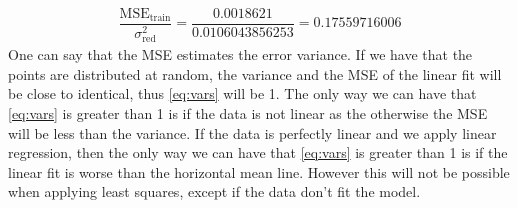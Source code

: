 \documentclass{article}
\begin{document}
\begin{align}
\label{eq:vars}
\dfrac{\text{MSE}_{\text{train}}}{\sigma^2_{\text{red}}} =
\dfrac{0.0018621}{0.0106043856253} = 0.17559716006
\end{align}
One can say that the MSE estimates the error variance. If we have that the points are distributed at random, the variance and the MSE of the linear fit will be close to identical, thus \eqref{eq:vars} will be 1. The only way we can have that \eqref{eq:vars} is greater than 1 is if the data is not linear as the otherwise the MSE will be less than the variance. If the data is perfectly linear and we apply linear regression, then the only way we can have that \eqref{eq:vars} is greater than 1 is if the linear fit is worse than the horizontal mean line. However this will not be possible when applying least squares, except if the data don't fit the model.
\end{document}
